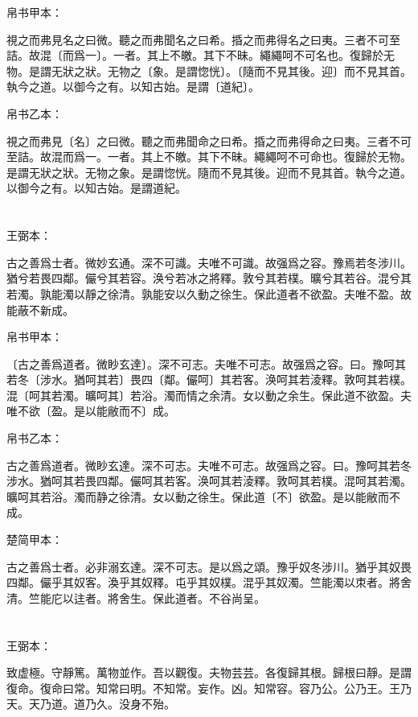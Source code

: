 \documentclass[a5paper]{ctexbook}
\begin{document}
    
    帛书甲本：

    視之而弗見名之曰微。聽之而弗聞名之曰希。捪之而弗得名之曰夷。三者不可至詰。故混〔而爲一〕。一者。其上不皦。其下不昧。繩繩呵不可名也。復歸於无物。是謂无狀之狀。无物之〔象。是謂惚恍〕。〔隨而不見其後。迎〕而不見其首。執今之道。以御今之有。以知古始。是謂〔道紀〕。

    帛书乙本：

    視之而弗見〔名〕之曰微。聽之而弗聞命之曰希。捪之而弗得命之曰夷。三者不可至詰。故混而爲一。一者。其上不皦。其下不昧。繩繩呵不可命也。復歸於无物。是謂无狀之狀。无物之象。是謂惚恍。隨而不見其後。迎而不見其首。執今之道。以御今之有。以知古始。是謂道紀。

    \chapter{}
    王弼本：

    古之善爲士者。微妙玄通。深不可識。夫唯不可識。故强爲之容。豫焉若冬涉川。猶兮若畏四鄰。儼兮其若容。涣兮若冰之將釋。敦兮其若樸。曠兮其若谷。混兮其若濁。孰能濁以靜之徐清。孰能安以久動之徐生。保此道者不欲盈。夫唯不盈。故能蔽不新成。

    
    帛书甲本：

    〔古之善爲道者。微眇玄達〕。深不可志。夫唯不可志。故强爲之容。曰。豫呵其若冬〔涉水。猶呵其若〕畏四〔鄰。儼呵〕其若客。涣呵其若淩釋。敦呵其若樸。混〔呵其若濁。曠呵其〕若浴。濁而情之余清。女以動之余生。保此道不欲盈。夫唯不欲〔盈。是以能敝而不〕成。

    帛书乙本：

    古之善爲道者。微眇玄達。深不可志。夫唯不可志。故强爲之容。曰。豫呵其若冬涉水。猶呵其若畏四鄰。儼呵其若客。涣呵其若淩釋。敦呵其若樸。混呵其若濁。曠呵其若浴。濁而静之徐清。女以動之徐生。保此道〔不〕欲盈。是以能敝而不成。

    楚简甲本：

    古之善爲士者。必非溺玄達。深不可志。是以爲之頌。豫乎奴冬涉川。猶乎其奴畏四鄰。儼乎其奴客。渙乎其奴釋。屯乎其奴樸。混乎其奴濁。竺能濁以朿者。將舍清。竺能庀以迬者。將舍生。保此道者。不谷尚呈。

    \chapter{}
    王弼本：

    致虚極。守靜篤。萬物並作。吾以觀復。夫物芸芸。各復歸其根。歸根曰靜。是謂復命。復命曰常。知常曰明。不知常。妄作。凶。知常容。容乃公。公乃王。王乃天。天乃道。道乃久。没身不殆。
\end{document}
